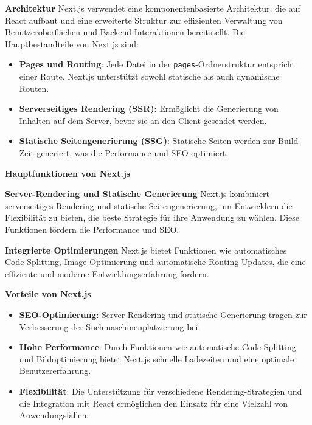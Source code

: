 \textbf{Architektur}
\newline Next.js verwendet eine komponentenbasierte Architektur, die auf React aufbaut und eine erweiterte Struktur zur effizienten Verwaltung von Benutzeroberflächen und Backend-Interaktionen bereitstellt. Die Hauptbestandteile von Next.js sind:
\begin{itemize} \item \textbf{Pages und Routing}: Jede Datei in der \texttt{pages}-Ordnerstruktur entspricht einer Route. Next.js unterstützt sowohl statische als auch dynamische Routen. \item \textbf{Serverseitiges Rendering (SSR)}: Ermöglicht die Generierung von Inhalten auf dem Server, bevor sie an den Client gesendet werden. \item \textbf{Statische Seitengenerierung (SSG)}: Statische Seiten werden zur Build-Zeit generiert, was die Performance und SEO optimiert.\textit{\cite{nextjs, nextjs_blog, rathinam2022analysis}} \end{itemize}

\textbf{Hauptfunktionen von Next.js}

\textbf{Server-Rendering und Statische Generierung}
Next.js kombiniert serverseitiges Rendering und statische Seitengenerierung, um Entwicklern die Flexibilität zu bieten, die beste Strategie für ihre Anwendung zu wählen. Diese Funktionen fördern die Performance und SEO.\textit{\cite{nextjs, nextjs_blog, shetty2020review}}

\textbf{Integrierte Optimierungen}
Next.js bietet Funktionen wie automatisches Code-Splitting, \newline
Image-Optimierung und automatische Routing-Updates, die eine effiziente und moderne Entwicklungserfahrung fördern.\textit{\cite{nextjs, rathinam2022analysis, nextjs_blog}}

\textbf{Vorteile von Next.js}
\begin{itemize} \item \textbf{SEO-Optimierung}: Server-Rendering und statische Generierung tragen zur Verbesserung der Suchmaschinenplatzierung bei.\textit{\cite{nextjs, nextjs_blog, shetty2020review}} \item \textbf{Hohe Performance}: Durch Funktionen wie automatische Code-Splitting und Bildoptimierung bietet Next.js schnelle Ladezeiten und eine optimale Benutzererfahrung.\textit{\cite{rathinam2022analysis, nextjs, shetty2020review}} \item \textbf{Flexibilität}: Die Unterstützung für verschiedene Rendering-Strategien und die Integration mit React ermöglichen den Einsatz für eine Vielzahl von Anwendungsfällen.\textit{\cite{nextjs_blog, nextjs, shetty2020review}} \end{itemize}

